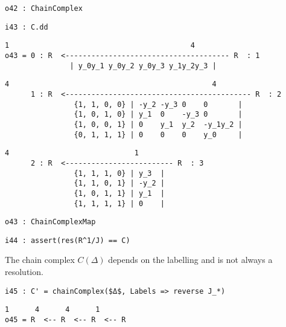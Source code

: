 \documentclass[12pt,leqno]{amsart}
\theoremstyle{definition}
\begin{document}
\begin{lstlisting}[xleftmargin=10pt, aboveskip=1.5pt, belowskip=1.5pt]
o42 : ChainComplex
\end{lstlisting}
\begin{lstlisting}[xleftmargin=10pt, aboveskip=1.5pt, belowskip=1.5pt]
i43 : C.dd
\end{lstlisting}
\begin{lstlisting}[xleftmargin=10pt, lineskip=-10pt, aboveskip=1.5pt, belowskip=3.0pt]
           1                                          4
o43 = 0 : R  <-------------------------------------- R  : 1
               | y_0y_1 y_0y_2 y_0y_3 y_1y_2y_3 |
\end{lstlisting}
\begin{lstlisting}[xleftmargin=10pt, lineskip=-10pt, aboveskip=1.5pt, belowskip=3.0pt]
           4                                               4
      1 : R  <------------------------------------------- R  : 2
                {1, 1, 0, 0} | -y_2 -y_3 0    0       |
                {1, 0, 1, 0} | y_1  0    -y_3 0       |
                {1, 0, 0, 1} | 0    y_1  y_2  -y_1y_2 |
                {0, 1, 1, 1} | 0    0    0    y_0     |
\end{lstlisting}
\begin{lstlisting}[xleftmargin=10pt, lineskip=-10pt, aboveskip=1.5pt, belowskip=1.5pt]
           4                             1
      2 : R  <------------------------- R  : 3
                {1, 1, 1, 0} | y_3  |
                {1, 1, 0, 1} | -y_2 |
                {1, 0, 1, 1} | y_1  |
                {1, 1, 1, 1} | 0    |
\end{lstlisting}
\begin{lstlisting}[xleftmargin=10pt, aboveskip=1.5pt, belowskip=1.5pt]
o43 : ChainComplexMap
\end{lstlisting}
\begin{lstlisting}[xleftmargin=10pt, aboveskip=1.5pt, belowskip=3.0pt]
i44 : assert(res(R^1/J) == C)
\end{lstlisting}
The chain complex $C(\Delta)$ 
depends on the labelling and is not always a resolution.
\begin{lstlisting}[xleftmargin=10pt, aboveskip=3.0pt, belowskip=1.5pt]
i45 : C' = chainComplex($Δ$, Labels => reverse J_*)
\end{lstlisting}
\begin{lstlisting}[xleftmargin=10pt, lineskip=-10pt, aboveskip=1.5pt, belowskip=1.5pt]
       1      4      4      1
o45 = R  <-- R  <-- R  <-- R
\end{lstlisting}
\end{document}
